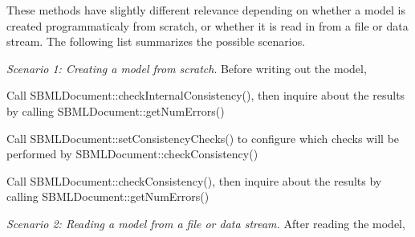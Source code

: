 These methods have slightly different relevance depending on whether a model is created programmaticaly from scratch, or whether it is read in from a file or data stream. The following list summarizes the possible scenarios.

{\itshape Scenario 1\+: Creating a model from scratch}. Before writing out the model,

\begin{DoxyItemize}
\item Call S\+B\+M\+L\+Document\+::check\+Internal\+Consistency(), then inquire about the results by calling S\+B\+M\+L\+Document\+::get\+Num\+Errors()\end{DoxyItemize}
\begin{DoxyItemize}
\item Call S\+B\+M\+L\+Document\+::set\+Consistency\+Checks() to configure which checks will be performed by S\+B\+M\+L\+Document\+::check\+Consistency()\end{DoxyItemize}
\begin{DoxyItemize}
\item Call S\+B\+M\+L\+Document\+::check\+Consistency(), then inquire about the results by calling S\+B\+M\+L\+Document\+::get\+Num\+Errors()\end{DoxyItemize}
{\itshape Scenario 2\+: Reading a model from a file or data stream.} After reading the model,


